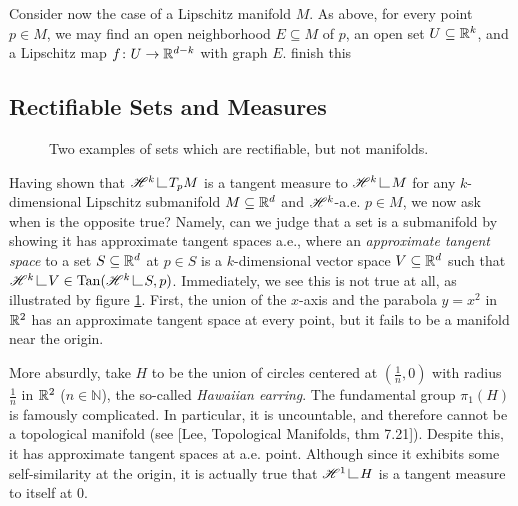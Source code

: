 Consider now the case of a Lipschitz manifold $M$. As above, for every point $p \in M$, we may find an open neighborhood $E \subseteq M$ of $p$, an open set $U \subseteq \mathbb{R}^k$, and a Lipschitz map $f \colon U \to \mathbb{R}^{d-k}$ with graph $E$. {\color{red} finish this}

\subsection{Rectifiable Sets and Measures} \label{sec:rectifiability}
\begin{figure} \label{fig:rectifiable}
    \centering
    \hspace{5em}
    \caption{Two examples of sets which are rectifiable, but not manifolds.}
\end{figure}

Having shown that $\scrH^k \restrict T_p M$ is a tangent measure to $\scrH^k \restrict M$ for any $k$-dimensional Lipschitz submanifold $M \subseteq \mathbb{R}^d$ and $\mathscr{H}^k$-a.e. $p \in M$, we now ask when is the opposite true? Namely, can we judge that a set is a submanifold by showing it has approximate tangent spaces a.e., where an \textit{approximate tangent space} to a set $S \subseteq \mathbb{R}^d$ at $p \in S$ is a $k$-dimensional vector space $V \subseteq \mathbb{R}^d$ such that $\scrH^k \restrict V \in \Tan(\scrH^k \restrict S,p)$. Immediately, we see this is not true at all, as illustrated by figure \ref{fig:rectifiable}. First, the union of the $x$-axis and the parabola $y = x^2$ in $\mathbb{R}^2$ has an approximate tangent space at every point, but it fails to be a manifold near the origin.

More absurdly, take $H$ to be the union of circles centered at $(\frac{1}{n},0)$ with radius $\frac{1}{n}$ in $\mathbb{R}^2$ ($n \in \mathbb{N}$), the so-called \textit{Hawaiian earring}. The fundamental group $\pi_1(H)$ is famously complicated. In particular, it is uncountable, and therefore cannot be a topological manifold (see [Lee, Topological Manifolds, thm 7.21]). Despite this, it has approximate tangent spaces at a.e. point. Although since it exhibits some self-similarity at the origin, it is actually true that $\scrH^1 \restrict H$ is a tangent measure to itself at 0.

